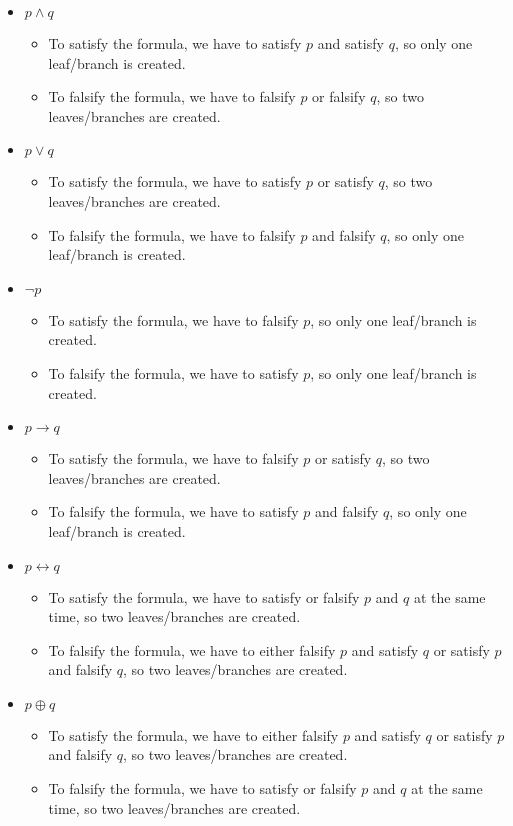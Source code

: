 \documentclass[a4paper,11pt]{report}
\begin{document}
\begin{itemize}
\item $p \wedge q$
  \begin{itemize}
  \item To satisfy the formula, we have to satisfy $p$ and satisfy $q$, so only one leaf/branch is created.
  \item To falsify the formula, we have to falsify $p$ or falsify $q$, so two leaves/branches are created.
  \end{itemize}
\item $p \vee q$ 
  \begin{itemize}
  \item To satisfy the formula, we have to satisfy $p$ or satisfy $q$, so two leaves/branches are created.
  \item To falsify the formula, we have to falsify $p$ and falsify $q$, so only one leaf/branch is created.
  \end{itemize}
\item $\neg p$ 
  \begin{itemize}
  \item To satisfy the formula, we have to falsify $p$, so only one leaf/branch is created.
  \item To falsify the formula, we have to satisfy $p$, so only one leaf/branch is created.
  \end{itemize}
\item $p \to q$ 
  \begin{itemize}
  \item To satisfy the formula, we have to falsify $p$ or satisfy $q$, so two leaves/branches are created.
  \item To falsify the formula, we have to satisfy $p$ and falsify $q$, so only one leaf/branch is created.
  \end{itemize}
\item $p \leftrightarrow q$ 
  \begin{itemize}
  \item To satisfy the formula, we have to satisfy or falsify $p$ and $q$ at the same time, so two leaves/branches are created.
  \item To falsify the formula, we have to either falsify $p$ and satisfy $q$ or satisfy $p$ and falsify $q$, so two leaves/branches are created.
  \end{itemize}
\item $p \oplus q$ 
  \begin{itemize}
  \item To satisfy the formula, we have to either falsify $p$ and satisfy $q$ or satisfy $p$ and falsify $q$, so two leaves/branches are created.
  \item To falsify the formula, we have to satisfy or falsify $p$ and $q$ at the same time, so two leaves/branches are created.
  \end{itemize}
\end{itemize}
\end{document}
